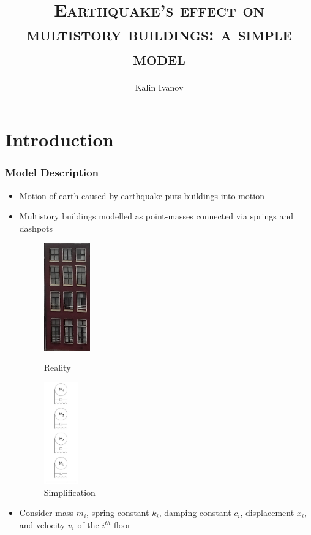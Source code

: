 \documentclass[xcolor=svgnames,9pt]{beamer}
\title[EQ's effect on multistory buildings]
{\textsc{Earthquake's effect on multistory buildings: a simple model}}
\institute[]{\large \textsc{\v{C}VUT FSv}}
\author[Kalin Ivanov]
{Kalin Ivanov}
\date[15 June 2017]
{Mathematics 2 Semester Project
\\
\bigskip
15 June 2017\\
\bigskip
\bigskip
\bigskip
\small supervised by Ing. Michal Bene\v{s}, Ph.D\par
}
\theoremstyle{remark}
\begin{document}
		\begin{frame}
  			\titlepage
		\end{frame}
	\section{Introduction}
		\begin{frame}
			\frametitle{Model Description}
			\begin{itemize}
				\item Motion of earth caused by earthquake puts buildings into motion
				\item Multistory buildings modelled as point-masses connected via springs and dashpots

				\begin{figure}
 				 	\begin{minipage}[b]{0.4\textwidth}
						\centering
    						\includegraphics[width=20mm]{pictures/bldg.png}
    						\caption{Reality}
						\label{bldg}
  					\end{minipage}
 					 \hfill
					\begin{minipage}[b]{0.4\textwidth}
						\centering
 				  	 	\includegraphics[width=15mm]{pictures/SPRINGS-Model1A.jpg}
    						\caption{Simplification}
						\label{Springs1}
 					 \end{minipage}
				\end{figure}

				\item Consider mass $m_i$, spring constant $k_i$, damping constant $c_i$, displacement $x_i$,  and velocity $v_i$ of the $i^{th}$ floor
			\end{itemize}
			\bigskip
		\end{frame}
\end{document}
